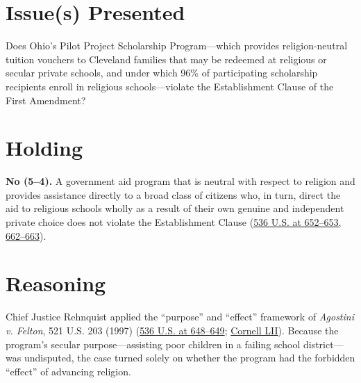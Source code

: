 \documentclass[12pt]{article}
\begin{document}
\section{Issue(s) Presented}

Does Ohio's Pilot Project Scholarship Program---which provides religion-neutral tuition vouchers to Cleveland families that may be redeemed at religious or secular private schools, and under which 96\% of participating scholarship recipients enroll in religious schools---violate the Establishment Clause of the First Amendment?

\section{Holding}

\textbf{No (5--4).} A government aid program that is neutral with respect to religion and provides assistance directly to a broad class of citizens who, in turn, direct the aid to religious schools wholly as a result of their own genuine and independent private choice does not violate the Establishment Clause (\href{https://supreme.justia.com/cases/federal/us/536/639/}{536 U.S. at 652--653, 662--663}).

\section{Reasoning}

Chief Justice Rehnquist applied the ``purpose'' and ``effect'' framework of \emph{Agostini v. Felton}, 521 U.S. 203 (1997) (\href{https://supreme.justia.com/cases/federal/us/536/639/}{536 U.S. at 648--649}; \href{https://www.law.cornell.edu/constitution-conan/amendment-1/zelman-and-indirect-aid}{Cornell LII}). Because the program's secular purpose---assisting poor children in a failing school district---was undisputed, the case turned solely on whether the program had the forbidden ``effect'' of advancing religion.
\end{document}
